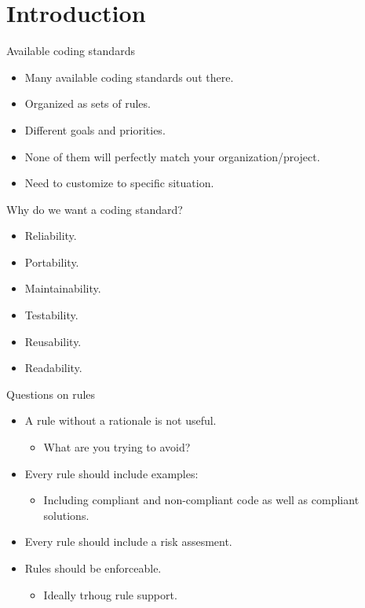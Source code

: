 \section{Introduction}

\begin{frame}[t]{Available coding standards}
\begin{itemize}
  \item Many available coding standards out there.

  \vfill
  \item Organized as sets of rules.

  \vfill
  \item Different goals and priorities.

  \vfill
  \item None of them will perfectly match your organization/project.

  \vfill
  \item Need to customize to specific situation.
\end{itemize}
\end{frame}

\begin{frame}[t]{Why do we want a coding standard?}
\begin{itemize}
  \item Reliability.
  \item Portability.
  \item Maintainability.
  \item Testability.
  \item Reusability.
  \item Readability.
\end{itemize}
\end{frame}

\begin{frame}[t]{Questions on rules}
\begin{itemize}
  \item A rule without a rationale is not useful.
    \begin{itemize}
      \item What are you trying to avoid?
    \end{itemize}

  \vfill\pause
  \item Every rule should include examples:
    \begin{itemize}
      \item Including compliant and non-compliant code as well as compliant solutions.
    \end{itemize}

  \vfill\pause
  \item Every rule should include a risk assesment.

  \vfill\pause
  \item Rules should be enforceable.
    \begin{itemize}
      \item Ideally trhoug rule support.
    \end{itemize}
\end{itemize}
\end{frame}

